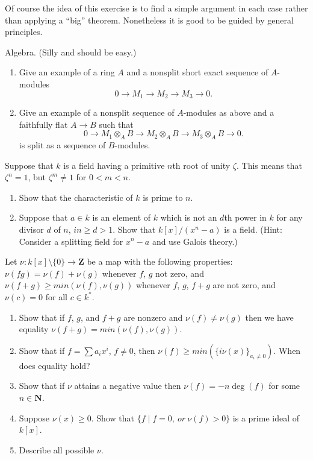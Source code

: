 \begin{remark}
\label{remark-simple-geometric}
Of course the idea of this exercise is to find
a simple argument in each case rather than applying a ``big'' theorem.
Nonetheless it is good to be guided by general principles.
\end{remark}

\begin{exercise}
\label{exercise-silly}
Algebra. (Silly and should be easy.)
\begin{enumerate}
\item Give an example of a ring $A$ and a nonsplit
short exact sequence of $A$-modules
$$
0 \to M_1 \to M_2 \to M_3 \to 0.
$$
\item Give an example of a nonsplit sequence of $A$-modules
as above and a faithfully flat $A \to B$ such that
$$
0 \to M_1\otimes_A B \to M_2\otimes_A B \to M_3\otimes_A B \to 0.
$$
is split as a sequence of $B$-modules.
\end{enumerate}
\end{exercise}

\begin{exercise}
\label{exercise-field-kummer}
Suppose that $k$ is a field having a primitive $n$th root
of unity $\zeta$. This means that $\zeta^n = 1$, but $\zeta^m\not = 1$ for
$0<m<n$.
\begin{enumerate}
\item Show that the characteristic of $k$ is prime to $n$.
\item Suppose that $a \in k$ is an element of $k$ which is not
an $d$th power in $k$ for any divisor $d$ of $n$, $in\geq d>1$. Show that
$k[x]/(x^n-a)$ is a field. (Hint: Consider a splitting field for
$x^n-a$ and use Galois theory.)
\end{enumerate}
\end{exercise}

\begin{exercise}
\label{exercise-valuation}
Let $\nu : k[x]\setminus \{0\}  \to {\mathbf Z}$ be a map
with the following properties: $\nu(fg) = \nu(f) + \nu(g)$ whenever
$f$, $g$ not zero, and  $\nu(f + g) \geq min(\nu(f), \nu(g))$ whenever
$f$, $g$, $f + g$ are not zero, and $\nu(c) = 0$ for all $c\in k^*$.
\begin{enumerate}
\item Show that if $f$, $g$, and $f + g$ are nonzero and
$\nu(f) \not = \nu(g)$ then we have equality $\nu(f + g) = min(\nu(f), \nu(g))$.
\item Show that if $f = \sum a_i x^i$, $f\not = 0$, then
$\nu(f) \geq min(\{i\nu(x)\}_{a_i\not = 0})$. When does equality hold?
\item Show that if $\nu$ attains a negative value then
$\nu(f) = -n \deg(f)$ for some $n\in {\mathbf N}$.
\item Suppose $\nu(x) \geq 0$. Show that
$\{f \mid f = 0, \ or\ \nu(f) > 0\}$ is a prime ideal of $k[x]$.
\item Describe all possible $\nu$.
\end{enumerate}
\end{exercise}


